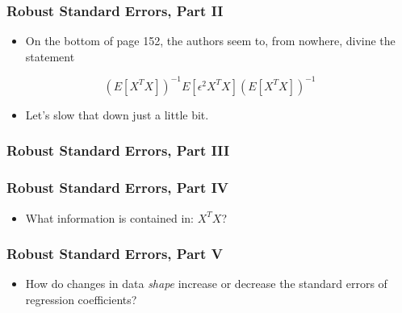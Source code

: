 \documentclass[12pt, block=fill]{beamer}
\begin{document}
\begin{frame}[t]
  \frametitle{Robust Standard Errors, Part II}

  \begin{itemize}
    \item On the bottom of page 152, the authors seem to, from nowhere, divine the statement
  \end{itemize}

  \[
    \left( E[X^{T}X]\right)^{-1} E[\epsilon^{2}X^{T}X] \left( E[X^{T}X]\right)^{-1}
  \]

  \begin{itemize}
      \item Let's slow that down just a little bit. 
  \end{itemize}
\end{frame}

\begin{frame}
  \frametitle{Robust Standard Errors, Part III}

\end{frame}

\begin{frame}[t]
  \frametitle{Robust Standard Errors, Part IV}

  \begin{itemize}
    \item What information is contained in: $X^{T}X$?
  \end{itemize}


\end{frame}

\begin{frame}[t]
  \frametitle{Robust Standard Errors, Part V}

  \begin{itemize}
      \item How do changes in data \textit{shape} increase or decrease the standard errors of regression coefficients?
  \end{itemize}



\end{frame}
\end{document}
